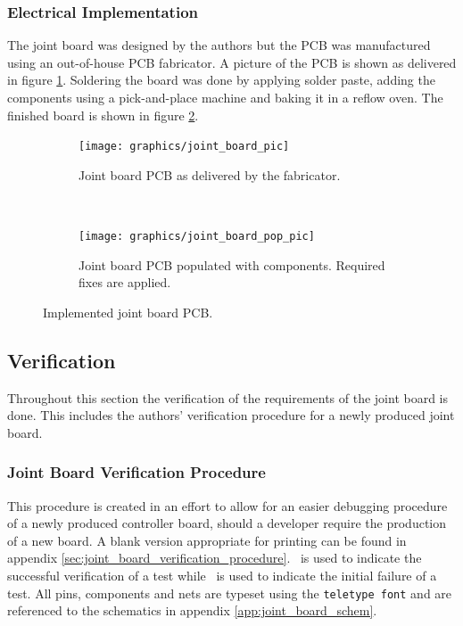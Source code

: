 \subsubsection{Electrical Implementation} %
\label{sub:electrical_implementation}
The joint board was designed by the authors but the PCB was manufactured using an out-of-house PCB fabricator. 
A picture of the PCB is shown as delivered in figure \ref{sfig:joint_board_pic}.
Soldering the board was done by applying solder paste, adding the components using a pick-and-place machine and baking it in a reflow oven.
The finished board is shown in figure \ref{sfig:joint_board_pop_pic}.
\begin{figure}
	\centering
	\begin{subfigure}[t]{0.40\textwidth}
		\centering
		\texttt{[image: graphics/joint\_board\_pic]}
		\caption{Joint board PCB as delivered by the fabricator.}
		\label{sfig:joint_board_pic}
	\end{subfigure}
	~
	\begin{subfigure}[t]{0.40\textwidth} 
		\centering
		\texttt{[image: graphics/joint\_board\_pop\_pic]}
		\caption[Joint board PCB populated with components]{Joint board PCB populated with components. Required fixes are applied.}
		\label{sfig:joint_board_pop_pic}
	\end{subfigure}
	\caption{Implemented joint board PCB.}
	\label{fig:joint_board_pic_full}
\end{figure}


\subsection{Verification}
\label{sub:verification_joint_board_}
Throughout this section the verification of the requirements of the joint board is done.
This includes the authors' verification procedure for a newly produced joint board.

\subsubsection{Joint Board Verification Procedure} %
\label{ssub:joint_board_verification_methodology}
This procedure is created in an effort to allow for an easier debugging procedure of a newly produced controller board, should a developer require the production of a new board.
A blank version appropriate for printing can be found in appendix \ref{sec:joint_board_verification_procedure}.
\cmark ~is used to indicate the successful verification of a test while \xmark ~is used to indicate the initial failure of a test.
All pins, components and nets are typeset using the \texttt{teletype font} and are referenced to the schematics in appendix \ref{app:joint_board_schem}.
